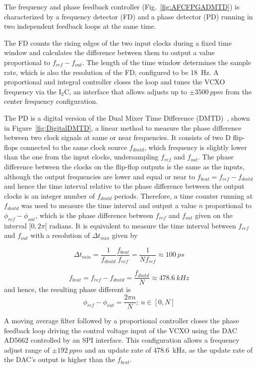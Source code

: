 \documentclass[a4paper,
               biblatex,      %
               ]{jacow}
\begin{document}
The frequency and phase feedback controller (Fig.~\ref{fig:AFCFPGADMTD}) is characterized by a frequency detector (FD) and a phase detector (PD) running in two independent feedback loops at the same time.

The FD counts the rising edges of the two input clocks during a fixed time window and calculates the difference between them to output a value proportional to $f_{ref}-f_{out}$. The length of the time window determines the sample rate, which is also the resolution of the FD, configured to be 18~Hz. A proportional and integral controller closes the loop and tunes the VCXO frequency via the I$_{2}$C, an interface that allows adjusts up to $\pm3500~ppm$ from the center frequency configuration. 

The PD is a digital version of the Dual Mixer Time Difference (DMTD)~\cite{allan1975picosecond}, shown in Figure~\ref{fig:DigitalDMTD}, a linear method to measure the phase difference between two clock signals at same or near frequencies. It consists of two D flip-flops connected to the same clock source $f_{dmtd}$, which frequency is slightly lower than the one from the input clocks, undersampling $f_{ref}$ and $f_{out}$. The phase difference between the clocks on the flip-flop outputs is the same as the inputs, although the output frequencies are lower and equal or near to $f_{beat}=f_{ref}-f_{dmtd}$ and hence the time interval relative to the phase difference between the output clocks is an integer number of $f_{dmtd}$ periods. Therefore, a time counter running at $f_{dmtd}$ was used to measure the time interval and output a value $n$ proportional to $\phi_{ref}-\phi_{out}$, which is the phase difference between $f_{ref}$ and $f_{out}$ given on the interval $[0,2\pi[$ radians. It is equivalent to measure the time interval between $f_{ref}$ and $f_{out}$ with a resolution of $\Delta t_{min}$ given by

\[\Delta t_{min} = \frac{1}{f_{dmtd}}\frac{f_{beat}}{f_{ref}} = \frac{1}{Nf_{ref}} \approx 100~ps\]

\[f_{beat} = f_{ref}-f_{dmtd} = \frac{f_{dmtd}}{N} \approx 478.6~kHz\]
and hence, the resulting phase different is
\[\phi_{ref}-\phi_{out} = \frac{2\pi n}{N};~n \in [0,N]\]

A moving average filter followed by a proportional controller closes the phase feedback loop driving the control voltage input of the VCXO using the DAC AD5662 controlled by an SPI interface. This configuration allows a frequency adjust range of $\pm192~ppm$ and an update rate of 478.6~kHz, as the update rate of the DAC's output is higher than the $f_{beat}$.
\end{document}
